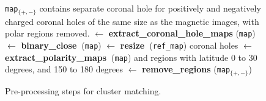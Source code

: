       \begin{figure}[t!]
        \begin{algorithmic}[1]  
                \\
                \\
                   {\tt map$_{\{+,-\}}$} contains separate coronal hole 
                \Statex  \hspace{1.4cm} for positively and negatively charged coronal 
                \Statex  \hspace{1.4cm} holes of the same size as the magnetic images,
                \Statex  \hspace{1.4cm} with polar regions removed.
                \Statex
                \State {}
                 $\gets$ {\small \textbf{extract\_coronal\_hole\_maps}} ({\tt map})
                \State
                \State {}
                 $\gets$ {\bf binary\_close~}({\tt map})
                \Statex
                \State {}
                 $\gets$ {\bf resize~}({\tt ref\_map})
                \Statex
                \State {}
                \Statex \hspace{1cm} {coronal holes}
                 $\gets$ {\bf extract\_polarity\_maps~}({\tt map})     
                \Statex
                \State  {}
                \Statex \hspace{0.8cm} and regions with latitude 0 to 30 degrees, and 
                \Statex \hspace{0.8cm} 150 to 180 degrees
                  $\gets$  {\bf remove\_regions} ({\tt map$_{\{+,-\}}$})
                \Statex
                \State {}
                \EndFunction
        \end{algorithmic}  
        \caption{\label{fig:preProcessing}Pre-processing steps for cluster matching.}
\end{figure} 
